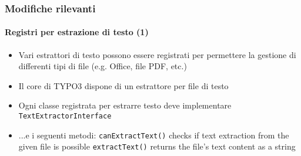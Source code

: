 \begin{frame}[fragile]
	\frametitle{Modifiche rilevanti}
	\framesubtitle{Registri per estrazione di testo (1)}

	\lstset{basicstyle=\tiny\ttfamily}

	\begin{itemize}

		\item Vari estrattori di testo possono essere registrati per permettere la gestione
			di differenti tipi di file (e.g. Office, file PDF, etc.)

		\item Il core di TYPO3 dispone di un estrattore per file di testo

		\item Ogni classe registrata per estrarre testo deve implementare \texttt{TextExtractorInterface}

		\item ...e i seguenti metodi:\newline
			\texttt{canExtractText()}\newline
			\small
				checks if text extraction from the given file is possible
			\normalsize
			\newline
			\texttt{extractText()}\newline
			\small
				returns the file's text content as a string
			\normalsize

	\end{itemize}

\end{frame}

